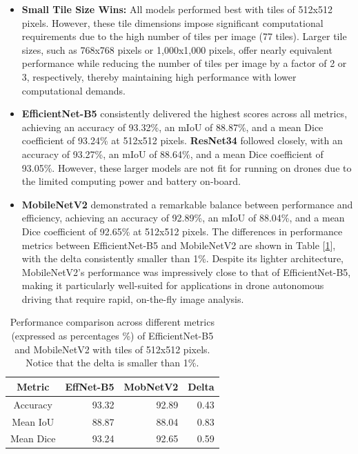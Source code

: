 \documentclass[a4paper]{article}
\begin{document}
\begin{itemize}
    \item \textbf{Small Tile Size Wins:} All models performed best with tiles of 512x512 pixels. However, these tile dimensions impose significant computational requirements due to the high number of tiles per image (77 tiles). Larger tile sizes, such as 768x768 pixels or 1,000x1,000 pixels, offer nearly equivalent performance while reducing the number of tiles per image by a factor of 2 or 3, respectively, thereby maintaining high performance with lower computational demands.
    \item \textbf{EfficientNet-B5} consistently delivered the highest scores across all metrics, achieving an accuracy of 93.32\%, an mIoU of 88.87\%, and a mean Dice coefficient of 93.24\% at 512x512 pixels. \textbf{ResNet34} followed closely, with an accuracy of 93.27\%, an mIoU of 88.64\%, and a mean Dice coefficient of 93.05\%. However, these larger models are not fit for running on drones due to the limited computing power and battery on-board.
    \item \textbf{MobileNetV2} demonstrated a remarkable balance between performance and efficiency, achieving an accuracy of 92.89\%, an mIoU of 88.04\%, and a mean Dice coefficient of 92.65\% at 512x512 pixels. The differences in performance metrics between EfficientNet-B5 and MobileNetV2 are shown in Table [\ref{tab:delta_table}], with the delta consistently smaller than 1\%. Despite its lighter architecture, MobileNetV2's performance was impressively close to that of EfficientNet-B5, making it particularly well-suited for applications in drone autonomous driving that require rapid, on-the-fly image analysis.
\end{itemize}

\begin{table}[!htbp]
    \centering
    \begin{tabular}{|c|r|r|r|}
    \hline
     Metric    &  EffNet-B5 & MobNetV2 & Delta \\ \hline
     Accuracy    &  93.32 & 92.89 & 0.43 \\ \hline
     Mean IoU    &  88.87 & 88.04 & 0.83 \\ \hline
     Mean Dice    & 93.24 & 92.65 & 0.59 \\ \hline
    \end{tabular}
    \caption{Performance comparison across different metrics (expressed as percentages \%) of EfficientNet-B5 and MobileNetV2 with tiles of 512x512 pixels. Notice that the delta is smaller than 1\%.}
    \label{tab:delta_table}
\end{table}
\end{document}
